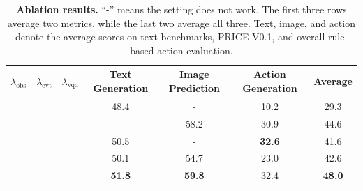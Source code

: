 \documentclass{llmxive}
\begin{document}
\begin{table}[!htbp]
  \centering
%
    \begin{tabular}{ccc|ccc|c}
    \toprule[1pt]
     $\lambda_{\mathrm{obs}}$   & $\lambda_{\mathrm{evt}}$ & $\lambda_{\mathrm{vqa}}$ & Text Generation & 
     Image Prediction& Action Generation & \textbf{Average} \\
     \midrule[0.5pt]
     &    &   & 48.4 & - & 10.2 & 29.3 \\
     
         &   &  &    -  & 58.2  & 30.9  & 44.6 \\
    &     &     & 50.5 & - & \textbf{32.6} & 41.6 \\
    \midrule[0.5pt]
    &    &     & 50.1 & 54.7 & 23.0 & 42.6 \\
    \rowcolor[rgb]{ .89,  .949,  .851}&     &     & \textbf{51.8} & \textbf{59.8} & 32.4& \textbf{48.0} \\
    \bottomrule[1pt]
    \end{tabular}%
    \vspace{-1em}
\caption{\textbf{Ablation results.} ``-'' means the setting does not work. The first three rows average two metrics, while the last two average all three. Text, image, and action denote the average scores on text benchmarks, PRICE-V0.1, and overall rule-based action evaluation.}
\label{tab:ablation}
\end{table}%
\end{document}
